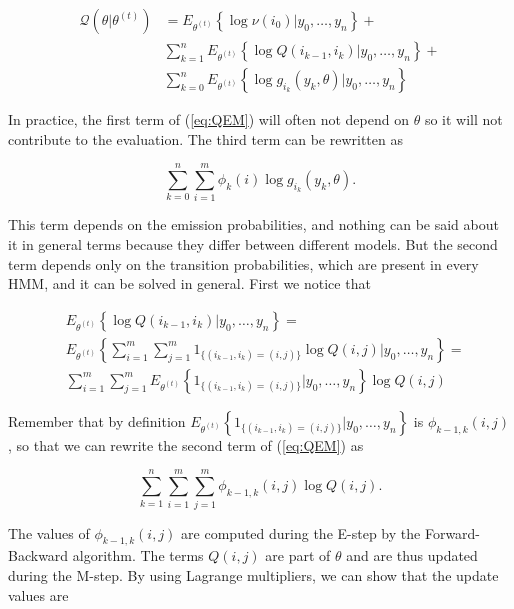 \documentclass[12pt]{article}
\begin{document}
\begin{appendices}
    \begin{align}
      \mathcal{Q}(\theta|\theta^{(t)}) &=
      E_{\theta^{(t)}} \left\{ \log \nu(i_0)
      \big| y_0, \ldots, y_n \right\} + \nonumber \\
      &\sum_{k=1}^n E_{\theta^{(t)}} \left\{
        \log Q(i_{k-1}, i_k)\big| y_0,
            \ldots, y_n \right\} + \label{eq:QEM} \\
      &\sum_{k=0}^n E_{\theta^{(t)}} \left\{
        \log g_{i_k}(y_k, \theta) \big| y_0, \ldots, y_n \right\}
        \nonumber
    \end{align}

    In practice, the first term of (\ref{eq:QEM}) will often not depend
    on $\theta$ so it will not contribute to the evaluation.
    The third term can be rewritten as

    $$\sum_{k=0}^n\sum_{i=1}^m \phi_k(i) \log g_{i_k}(y_k, \theta).$$

    This term depends on the emission probabilities, and nothing
    can be said about it in general terms because they differ
    between different models. But the second term depends only on
    the transition probabilities, which are present in every HMM,
    and it can be solved in general. First we notice that

    \begin{align*}
      &E_{\theta^{(t)}} \left\{ \log Q(i_{k-1}, i_k)
      \big| y_0, \ldots, y_n \right\} = \\
      &E_{\theta^{(t)}} \left\{ \sum_{i=1}^m\sum_{j=1}^m 
      1_{\{(i_{k-1}, i_k) = (i,j)\}} \log Q(i,j)
      \big| y_0, \ldots, y_n \right\} = \\
      &\sum_{i=1}^m\sum_{j=1}^m E_{\theta^{(t)}} \left\{
      1_{\{(i_{k-1}, i_k) = (i,j)\}} \big| y_0, \ldots, y_n \right\}
      \log Q(i,j)
    \end{align*}

    Remember that by definition $E_{\theta^{(t)}} \left\{
    1_{\{(i_{k-1}, i_k) = (i,j)\}} \big| y_0, \ldots, y_n \right\}$
    is $\phi_{k-1,k}(i,j)$, so that we can rewrite the second term
    of (\ref{eq:QEM}) as

    $$ \sum_{k=1}^n\sum_{i=1}^m\sum_{j=1}^m \phi_{k-1,k}(i,j)
      \log Q(i,j). $$

    The values of $\phi_{k-1,k}(i,j)$ are computed during the
    E-step by the Forward-Backward algorithm.
    The terms $Q(i,j)$ are part of $\theta$ and are thus updated
    during the M-step. By using Lagrange multipliers, we can show
    that the update values are


\end{appendices}
\end{document}
